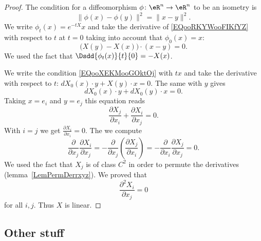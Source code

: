 \begin{proof}
    The condition for a diffeomorphism \( \phi\colon \eR^n\to \eR^n\) to be an isometry is
    \begin{equation}        \label{EQooRKYWooFIKfYZ}
        \| \phi(x)- \phi(y) \|^2=\| x-y \|^2.
    \end{equation}
    We write \( \phi_t(x)= e^{-tX}x\) and take the derivative of \eqref{EQooRKYWooFIKfYZ} with respect to \( t\) at \( t=0\) taking into account that \( \phi_0(x)=x\):
    \begin{equation}        \label{EQooXEKMooGOktOj}
        \big( X(y)-X(x) \big)\cdot (x-y)=0.
    \end{equation}
    We used the fact that \( \Dsdd{ \phi_t(x) }{t}{0}=-X(x)\).

    We write the condition \eqref{EQooXEKMooGOktOj} with \( tx\) and take the derivative with respect to \( t\): \( dX_0(x)\cdot y+X(y)\cdot x=0\). The same with \( y\) gives
    \begin{equation}
        dX_0(x)\cdot y+dX_0(y)\cdot x=0.
    \end{equation}
    Taking \( x=e_i\) and \( y=e_j\) this equation reads
    \begin{equation}
        \frac{ \partial X_j }{ \partial x_i }+\frac{ \partial X_i }{ \partial x_j }=0.
    \end{equation}
    With \( i=j\) we get \( \frac{ \partial X_i }{ \partial x_i }=0\). The we compute
    \begin{equation}
        \frac{ \partial  }{ \partial x_j }\frac{ \partial X_i }{ \partial x_j }=-\frac{ \partial  }{ \partial x_j }\left( \frac{ \partial X_j }{ \partial x_i } \right)=-\frac{ \partial  }{ \partial x_i }\frac{ \partial X_j }{ \partial x_j }=0.
    \end{equation}
    We used the fact that \( X_j\) is of class \( C^2\) in order to permute the derivatives (lemma~\ref{LemPermDerrxyz}). We proved that
    \begin{equation}
        \frac{ \partial^2 X_i  }{ \partial x_j }=0
    \end{equation}
    for all \( i,j\). Thus \( X\) is linear.
\end{proof}

\subsection{Other stuff}

